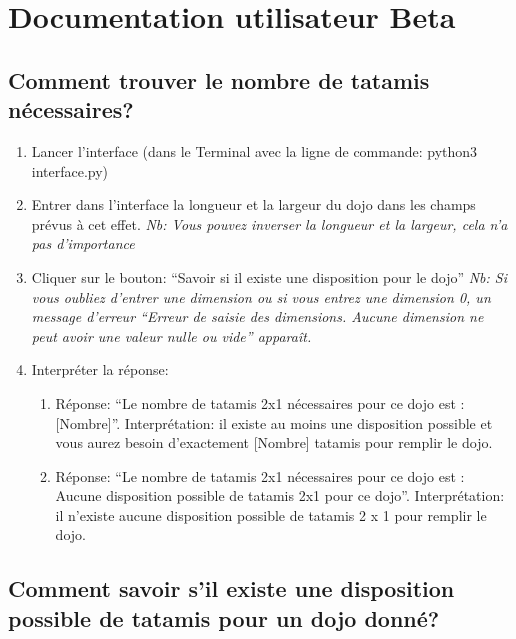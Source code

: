 

\section{Documentation utilisateur Beta}

\subsection{Comment trouver le nombre de tatamis nécessaires?}

\begin{enumerate}
    \item Lancer l’interface (dans le Terminal avec la ligne de commande: python3 interface.py)
    \item Entrer dans l’interface la longueur et la largeur du dojo dans les champs prévus à cet effet.
          \emph{Nb: Vous pouvez inverser la longueur et la largeur, cela n’a pas d’importance}
    \item Cliquer sur le bouton: “Savoir si il existe une disposition pour le dojo”
          \emph{ Nb: Si vous oubliez d’entrer une dimension ou si vous entrez une dimension 0,
              un message d’erreur “Erreur de saisie des dimensions. Aucune dimension ne peut avoir une valeur nulle ou vide” apparaît.}
    \item Interpréter la réponse:
          \begin{enumerate}
              \item  Réponse: “Le nombre de tatamis 2x1 nécessaires pour ce dojo est :
                    [Nombre]”. Interprétation: il existe au moins une disposition possible et vous aurez besoin d’exactement [Nombre] tatamis pour remplir le dojo.
              \item  Réponse: “Le nombre de tatamis 2x1 nécessaires pour ce dojo est :
                    Aucune disposition possible de tatamis 2x1 pour ce dojo”. Interprétation:
                    il n’existe aucune disposition possible de tatamis 2 x 1 pour remplir le dojo.
          \end{enumerate}
\end{enumerate}

\subsection{Comment savoir s’il existe une disposition possible de tatamis pour un dojo donné?}


